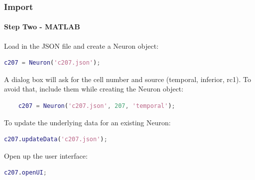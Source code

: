 \documentclass[11pt]{beamer}
\begin{document}
\begin{frame}[fragile]
	\frametitle{Import}
	\framesubtitle{Step Two - MATLAB}
	Load in the JSON file and create a Neuron object:
	\begin{lstlisting}[language=matlab]
	c207 = Neuron('c207.json');\end{lstlisting}
	A dialog box will ask for the cell number and source (temporal, inferior, rc1). To avoid that, include them while creating the Neuron object:
	\begin{lstlisting}[language=matlab]
	% output = Neuron(filename, cellNumber, source);
	c207 = Neuron('c207.json', 207, 'temporal');\end{lstlisting}
	To update the underlying data for an existing Neuron:
	\begin{lstlisting}[language=matlab]
	c207.updateData('c207.json');\end{lstlisting}
	Open up the user interface:
	\begin{lstlisting}[language=matlab]
	c207.openUI;\end{lstlisting}
\end{frame}
\end{document}
